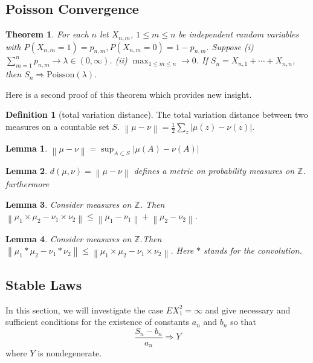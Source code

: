 \documentclass{article}
\newtheorem{Thm}{Theorem}[section]
\newtheorem{Lem}{Lemma}[section]
\theoremstyle{definition}
\newtheorem{Def}{Definition}[section]
\begin{document}
\subsection{Poisson Convergence}
\begin{Thm}
    For each $n$ let $X_{n,m}$, $1\le m\le n$ be independent random variables with $P(X_{n,m}=1)=p_{n,m},P(X_{n,m}=0)=1-p_{n,m}$. Suppose \newline 
(i) $\sum_{m=1}^n p_{n,m} \to\lambda\in(0,\infty)$.\newline 
(ii) $\max_{1\le m\le n}\to 0$.\newline 
If $S_n=X_{n,1}+\cdots+X_{n,n}$, then $S_n\Longrightarrow \text{Poisson}(\lambda)$.
\end{Thm}

Here is a second proof of this theorem which provides new insight.
\begin{Def}[total variation distance]
    The total variation distance between two measures on a countable set $S$. $\left\|\mu-\nu\right\|=\frac{1}{2}\sum_z\left|\mu(z)-\nu(z)\right|$.
\end{Def} 

\begin{Lem}
    $\left\|\mu-\nu\right\|=\sup_{A\subset S}\left|\mu(A)-\nu(A)\right|$
\end{Lem}

\begin{Lem}
    $d(\mu,\nu)=\left\|\mu-\nu\right\|$ defines a metric on probability measures on $\mathbb{Z}$. furthermore
\end{Lem}

\begin{Lem}
    Consider measures on $\mathbb{Z}$. Then $\left\|\mu_1\times\mu_2-\nu_1\times\nu_2\right\|\le\left\|\mu_1-\nu_1\right\|+\left\|\mu_2-\nu_2\right\|$.
\end{Lem}
\begin{Lem}
    Consider measures on $\mathbb{Z}$.Then $\left\|\mu_1*\mu_2-\nu_1*\nu_2\right\|\le \left\|\mu_1\times\mu_2-\nu_1\times\nu_2\right\|$.\newline
    Here $*$ stands for the convolution.
\end{Lem}

\subsection{Stable Laws}
In this section, we will investigate the case $EX_1^2=\infty$ and give necessary and sufficient conditions for the existence of constants $a_n$ and $b_n$ so that
\[\frac{S_n-b_n}{a_n}\Longrightarrow Y\] 
where $Y$ is nondegenerate.
\end{document}
